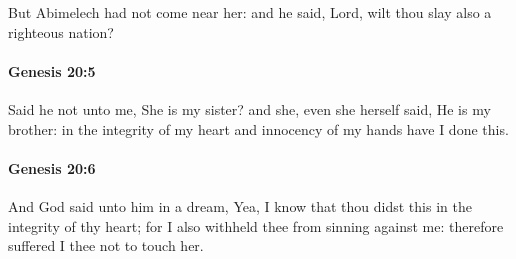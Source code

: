 			But Abimelech had not come near her: and he said, Lord, wilt thou slay also a righteous nation?


		\paragraph{Genesis 20:5} %
			\label{GENESIS-20-5}

			Said he not unto me, She is my sister?  and she, even she herself said, He is my brother: in the integrity of my heart and innocency of my hands have I done this.


		\paragraph{Genesis 20:6} %
			\label{GENESIS-20-6}

			And God said unto him in a dream, Yea, I know that thou didst this in the integrity of thy heart; for I also withheld thee from sinning against me: therefore suffered I thee not to touch her.


